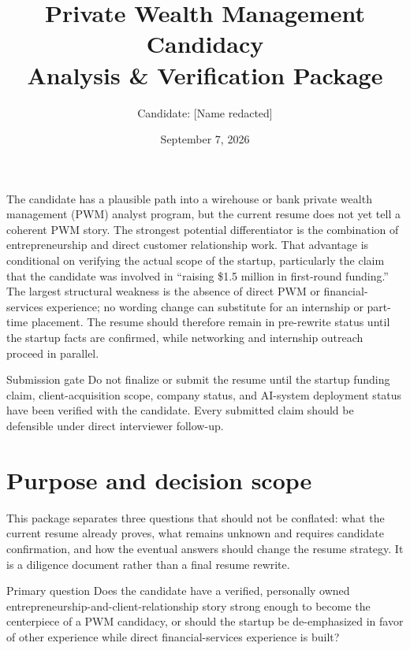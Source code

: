 \documentclass{reportkit}
\title{Private Wealth Management Candidacy\\Analysis \& Verification Package}
\author{Candidate: [Name redacted]}
\date{September 7, 2026}
\begin{document}
\maketitle

\begin{execsummary}
The candidate has a plausible path into a wirehouse or bank private wealth management (PWM) analyst program, but the current resume does not yet tell a coherent PWM story. The strongest potential differentiator is the combination of entrepreneurship and direct customer relationship work. That advantage is conditional on verifying the actual scope of the startup, particularly the claim that the candidate was involved in ``raising \$1.5 million in first-round funding.'' The largest structural weakness is the absence of direct PWM or financial-services experience; no wording change can substitute for an internship or part-time placement. The resume should therefore remain in pre-rewrite status until the startup facts are confirmed, while networking and internship outreach proceed in parallel.
\end{execsummary}

\begin{redflag}{Submission gate}
Do not finalize or submit the resume until the startup funding claim, client-acquisition scope, company status, and AI-system deployment status have been verified with the candidate. Every submitted claim should be defensible under direct interviewer follow-up.
\end{redflag}

\section{Purpose and decision scope}
This package separates three questions that should not be conflated: what the current resume already proves, what remains unknown and requires candidate confirmation, and how the eventual answers should change the resume strategy. It is a diligence document rather than a final resume rewrite.

\begin{researchproblem}{Primary question}
Does the candidate have a verified, personally owned entrepreneurship-and-client-relationship story strong enough to become the centerpiece of a PWM candidacy, or should the startup be de-emphasized in favor of other experience while direct financial-services experience is built?
\end{researchproblem}
\end{document}
